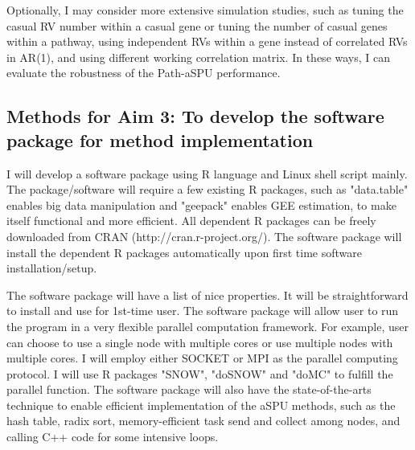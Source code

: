 \documentclass[12pt]{article}
\begin{document}
Optionally, I may consider more extensive simulation studies, such as tuning the casual RV number within a casual gene or tuning the number of casual genes within a pathway, using independent RVs within a gene instead of correlated RVs in AR(1), and using different working correlation matrix. In these ways,  I can evaluate the robustness of the Path-aSPU performance.

\subsection{Methods for Aim 3: To develop the software package for method implementation}
\label{sec:aim3}
I will develop a software package using R language and Linux shell script mainly. The package/software will require a few existing R packages, such as "data.table" enables big data manipulation and "geepack" enables GEE estimation, to make itself functional and more efficient. All dependent R packages can be freely downloaded from CRAN (http://cran.r-project.org/). The software package will install the dependent R packages automatically upon first time software installation/setup. 

The software package will have a list of nice properties. It will be straightforward to install and use for 1st-time user. The software package will allow user to run the program in a very flexible parallel computation framework. For example, user can choose to use a single node with multiple cores or use multiple nodes with multiple cores. I will employ either SOCKET or MPI as the parallel computing protocol. I will use R packages "SNOW", "doSNOW" and "doMC" to fulfill the parallel function. The software package will also have the state-of-the-arts technique to enable efficient implementation of the aSPU methods, such as the hash table, radix sort, memory-efficient task send and collect among nodes, and calling C++ code for some intensive loops. 
\end{document}
